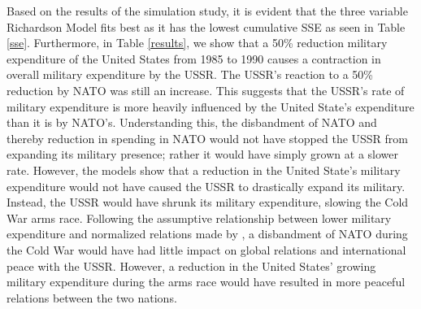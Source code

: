 \documentclass[12pt, centerh1]{article}
\begin{document}
Based on the results of the simulation study, it is evident that the three variable Richardson Model fits best as it has the lowest cumulative SSE as seen in Table \ref{sse}. Furthermore, in Table \ref{results}, we show that a 50\% reduction military expenditure of the United States from 1985 to 1990 causes a contraction in overall military expenditure by the USSR. The USSR's reaction to a 50\% reduction by NATO was still an increase.  This suggests that the USSR's rate of military expenditure is more heavily influenced by the United State's expenditure than it is by NATO's. Understanding this, the disbandment of NATO and thereby reduction in spending in NATO would not have stopped the USSR from expanding its military presence; rather it would have simply grown at a slower rate. However, the models show that a reduction in the United State's military expenditure would not have caused the USSR to drastically expand its military. Instead, the USSR would have shrunk its military expenditure, slowing the Cold War arms race. Following the assumptive relationship between lower military expenditure and normalized relations made by \cite{solarin2018determinants}, a disbandment of NATO during the Cold War would have had little impact on global relations and international peace with the USSR. However, a reduction in the United States' growing military expenditure during the arms race would have resulted in more peaceful relations between the two nations. 






\newpage



\end{document}
